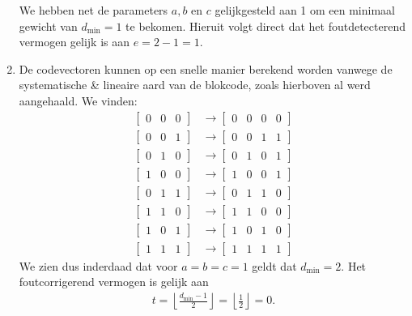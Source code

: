 \documentclass{kuburgiearticle}
\begin{document}
\begin{enumerate}
		We hebben net de parameters \(a,b\) en \(c\) gelijkgesteld aan 1 om een minimaal gewicht van \(d_{\min}=1\) te bekomen. Hieruit volgt direct dat het foutdetecterend vermogen gelijk is aan \(e=2-1=1\).

		\item De codevectoren kunnen op een snelle manier berekend worden vanwege de systematische \& lineaire aard van de blokcode, zoals hierboven al werd aangehaald. We vinden: \begin{align*}
			\begin{bmatrix} 0 & 0 & 0 \end{bmatrix} & \rightarrow \begin{bmatrix} 0 & 0 & 0 & 0 \end{bmatrix} \\
			\begin{bmatrix} 0 & 0 & 1 \end{bmatrix} & \rightarrow \begin{bmatrix} 0 & 0 & 1 & 1 \end{bmatrix} \\
			\begin{bmatrix} 0 & 1 & 0 \end{bmatrix} & \rightarrow \begin{bmatrix} 0 & 1 & 0 & 1 \end{bmatrix} \\
			\begin{bmatrix} 1 & 0 & 0 \end{bmatrix} & \rightarrow \begin{bmatrix} 1 & 0 & 0 & 1 \end{bmatrix} \\
			\begin{bmatrix} 0 & 1 & 1 \end{bmatrix} & \rightarrow \begin{bmatrix} 0 & 1 & 1 & 0 \end{bmatrix} \\
			\begin{bmatrix} 1 & 1 & 0 \end{bmatrix} & \rightarrow \begin{bmatrix} 1 & 1 & 0 & 0 \end{bmatrix} \\
			\begin{bmatrix} 1 & 0 & 1 \end{bmatrix} & \rightarrow \begin{bmatrix} 1 & 0 & 1 & 0 \end{bmatrix} \\
			\begin{bmatrix} 1 & 1 & 1 \end{bmatrix} & \rightarrow \begin{bmatrix} 1 & 1 & 1 & 1 \end{bmatrix}
		\end{align*}
		We zien dus inderdaad dat voor \(a=b=c=1\) geldt dat \(d_{\min}=2\). Het foutcorrigerend vermogen is gelijk aan \begin{align*}
			t = \left\lfloor \frac{d_{\min}-1}{2} \right\rfloor = \left\lfloor \frac{1}{2} \right\rfloor = 0.
		\end{align*}


\end{enumerate}
\end{document}
